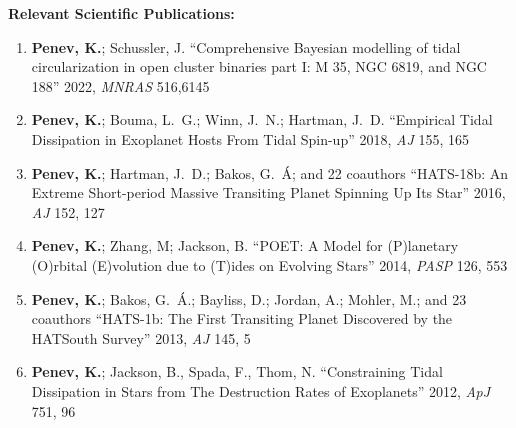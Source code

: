 %
\vspace{1mm}
%
%
\vspace{1mm}
{\bf \noindent Relevant Scientific Publications:\\}
\vspace{-5mm}
\begin{enumerate}
%


    \item \textbf{Penev, K.}; Schussler, J. ``Comprehensive Bayesian modelling
        of tidal circularization in open cluster binaries part I: M 35, NGC
        6819, and NGC 188'' 2022, {\em MNRAS} 516,6145

    \item \textbf{Penev, K.}; Bouma, L.~G.; Winn, J.~N.; Hartman, J.~D.
        ``Empirical Tidal Dissipation in Exoplanet Hosts From Tidal Spin-up''
        2018, {\em AJ} 155, 165

    \item \textbf{Penev, K.}; Hartman, J.~D.; Bakos, G.~{\'A}; and 22
        coauthors ``HATS-18b: An Extreme Short-period Massive Transiting
        Planet Spinning Up Its Star'' 2016, {\em AJ} 152, 127

	\item \textbf{Penev, K.}; Zhang, M; Jackson, B. ``POET: A Model for
		(P)lanetary (O)rbital (E)volution due to (T)ides on Evolving Stars''
        2014, {\em PASP} 126, 553

	\item \textbf{Penev, K.}; Bakos, G.~\'A.; Bayliss, D.; Jordan, A.;
		Mohler, M.; and 23 coauthors
		``HATS-1b: The First Transiting Planet Discovered by the HATSouth
		Survey'' 2013, {\em AJ} 145, 5

	\item \textbf{Penev, K.}; Jackson, B., Spada, F., Thom, N.
		``Constraining Tidal Dissipation in Stars from The Destruction Rates
		of Exoplanets'' 2012, {\em ApJ} 751, 96


\end{enumerate}
